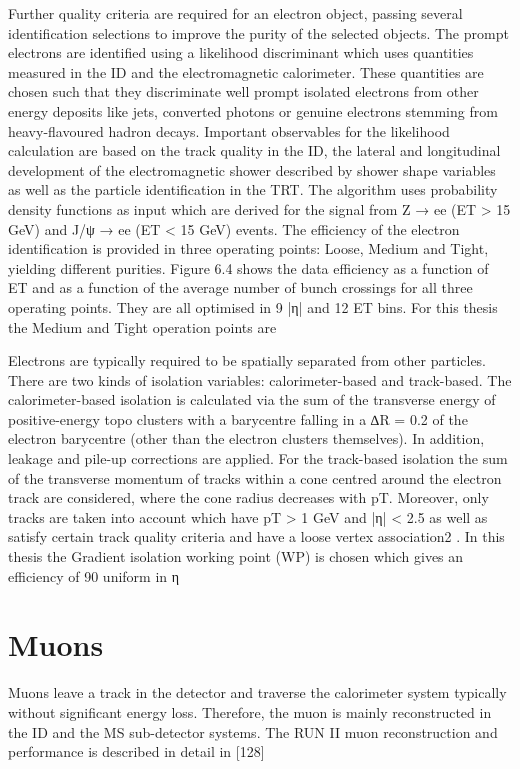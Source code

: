 Further quality criteria are required for an electron object, passing several identification selections
to improve the purity of the selected objects. The prompt electrons are identified using a likelihood
discriminant which uses quantities measured in the ID and the electromagnetic calorimeter. These
quantities are chosen such that they discriminate well prompt isolated electrons from other energy
deposits like jets, converted photons or genuine electrons stemming from heavy-flavoured hadron
decays. Important observables for the likelihood calculation are based on the track quality in the ID,
the lateral and longitudinal development of the electromagnetic shower described by shower shape
variables as well as the particle identification in the TRT. The algorithm uses probability density
functions as input which are derived for the signal from Z → ee (ET > 15 GeV) and J/ψ → ee
(ET < 15 GeV) events.
The efficiency of the electron identification is provided in three operating points: Loose, Medium
and Tight, yielding different purities. Figure 6.4 shows the data efficiency as a function of ET and
as a function of the average number of bunch crossings for all three operating points. They are
all optimised in 9 |η| and 12 ET bins. For this thesis the Medium and Tight operation points are

Electrons are typically required to be spatially separated from other particles. There are two kinds of
isolation variables: calorimeter-based and track-based.
The calorimeter-based isolation is calculated via the sum of the transverse energy of positive-energy
topo clusters with a barycentre falling in a ∆R = 0.2 of the electron barycentre (other than the
electron clusters themselves). In addition, leakage and pile-up corrections are applied.
For the track-based isolation the sum of the transverse momentum of tracks within a cone centred
around the electron track are considered, where the cone radius decreases with pT. Moreover, only
tracks are taken into account which have pT > 1 GeV and |η| < 2.5 as well as satisfy certain track
quality criteria and have a loose vertex association2
. In this thesis the Gradient isolation working
point (WP) is chosen which gives an efficiency of 90%
uniform in η

\section{Muons}

Muons leave a track in the detector and traverse the calorimeter system typically without significant
energy loss. Therefore, the muon is mainly reconstructed in the ID and the MS sub-detector systems.
The RUN II muon reconstruction and performance is described in detail in [128]

